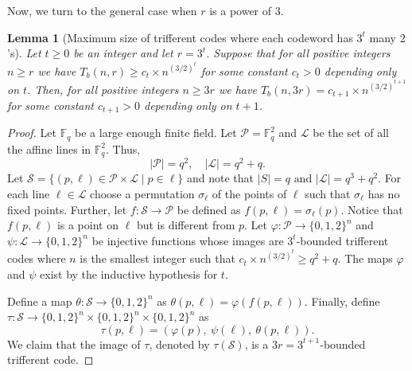 \documentclass[10pt,a4paper]{article}
\newcommand{\F}{\mathbb{F}}
\newcommand{\set}[1]{\{#1\}}
\newtheorem{lemma}[theorem]{Lemma}
\DeclareMathOperator{\1}{\mathbf{1}}
\begin{document}
Now, we turn to the general case when $r$ is a power of $3$.
\begin{lemma}[Maximum size of trifferent codes where each codeword has $3^t$ many $2$'s]
	\label{lem:upper_bound_general_rbounded}
	Let $t\geq 0$ be an integer and let $r=3^t$. Suppose that for all positive integers $n\geq r$  we have $T_b(n,r) \geq c_t \times n^{(3/2)^t}$ for some constant $c_t>0$ depending only on $t$. Then, for all positive integers $n\geq 3r$ we have $T_b(n,3r) = c_{t+1}\times n^{(3/2)^{t+1}}$ for some constant $c_{t+1}>0$ depending only on $t+1$.
\end{lemma}




\begin{proof} Let $\F_q$ be a large enough finite field. Let $\mathcal P = \F_q^2$ and $\mathcal L$ be the set of all the affine lines in $\F_q^2$.
	Thus,
\begin{equation*}
		|\mathcal P| = q^2, \quad |\mathcal L| = q^2 + q.
	\end{equation*}
    Let $\mathcal S = \set{(p, \ell)\in \mathcal P\times \mathcal L \mid p\in \ell}$ and note that $|S| = q \text{ and } |\mathcal L| = q^3 + q^2$.  
	For each line $\ell \in \mathcal{L}$ choose a permutation $\sigma_\ell$ of the points of $\ell$ such that $\sigma_\ell$ has no fixed points. Further, let $f:\mathcal{S} \to \mathcal P$ be defined as $f(p,\ell) = \sigma_\ell (p)$. Notice that $f(p, \ell)$ is a point on $\ell$ but is different from $p$.
	Let $\varphi: \mathcal P \to \set{0,1,2}^n$ and $\psi: \mathcal L\to \set{0,1,2}^n$ be injective functions whose images are $3^t$-bounded trifferent codes where $n$ is the smallest integer such that $c_t\times n^{(3/2)^t} \geq q^2+q$.
	The maps $\varphi$ and $\psi$ exist by the inductive hypothesis for $t$.
	
Define a map $\theta:\mathcal S \to \set{0,1,2}^n$ as $\theta(p, \ell) = \varphi(f(p, \ell))$.
	Finally, define $\tau:\mathcal S\to \set{0,1,2}^n\times \set{0,1,2}^n\times \set{0,1,2}^n$ as
\begin{equation*}
		\tau(p, \ell) = (\varphi(p),\ \psi(\ell),\ \theta(p, \ell)).
	\end{equation*}
	We claim that the image of $\tau$, denoted by $\tau(\mathcal{S})$, is a $3r=3^{t+1}$-bounded trifferent code.


\end{proof}
\end{document}

